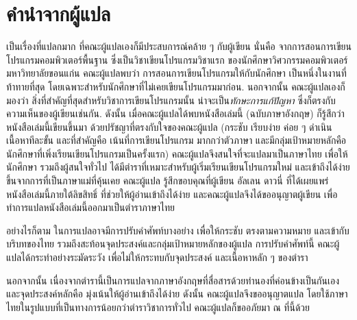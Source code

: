 \pagebreak

\section*{คำนำจากผู้แปล}

เป็นเรื่องที่แปลกมาก ที่คณะผู้แปลเองก็มีประสบการณ์คล้าย ๆ กับผู้เขียน
นั่นคือ จากการสอนการเขียนโปรแกรมคอมพิวเตอร์พื้นฐาน ซึ่งเป็นวิชาเขียนโปรแกรมวิชาแรก
ของนักศึกษาวิศวกรรมคอมพิวเตอร์ มหาวิทยาลัยขอนแก่น
คณะผู้แปลพบว่า
การสอนการเขียนโปรแกรมให้กับนักศึกษา 
เป็นหนึ่งในงานที่ท้าทายที่สุด
โดยเฉพาะสำหรับนักศึกษาที่ไม่เคยเขียนโปรแกรมมาก่อน.
นอกจากนั้น คณะผู้แปลเองก็มองว่า สิ่งที่สำคัญที่สุดสำหรับวิชาการเขียนโปรแกรมนั้น
น่าจะเป็น\textit{ทักษะการแก้ปัญหา}
ซึ่งก็ตรงกับความเห็นของผู้เขียนเช่นกัน.
ดังนั้น เมื่อคณะผู้แปลได้พบหนังสือเล่มนี้ (ฉบับภาษาอังกฤษ) 
ก็รู้สึกว่า หนังสือเล่มนี้เขียนขึ้นมา ด้วยปรัชญาที่ตรงกับใจของคณะผู้แปล (กระชับ เรียบง่าย ค่อย ๆ ดำเนินเนื้อหาทีละขั้น และที่สำคัญคือ เน้นที่การเขียนโปรแกรม มากกว่าตัวภาษา 
และมีกลุ่มเป้าหมายหลักคือ นักศึกษาที่เพิ่งเรียนเขียนโปรแกรมเป็นครั้งแรก)
คณะผู้แปลจึงสนใจที่จะแปลมาเป็นภาษาไทย เพื่อให้นักศึกษา รวมถึงผู้สนใจทั่วไป ได้มีตำราที่เหมาะสำหรับผู้เริ่มเรียนเขียนโปรแกรมใหม่ และเข้าถึงได้ง่ายขึ้นจากการที่เป็นภาษาแม่ที่คุ้นเคย 
คณะผู้แปล 
รู้สึกขอบคุณที่ผู้เขียน อัลเลน ดาวนี่ ที่ได้เผยแพร่หนังสือเล่มนี้ภายใต้ลิขสิทธิ์ ที่ช่วยให้ผู้อ่านเข้าถึงได้ง่าย 
และคณะผู้แปลจึงได้ขออนุญาตผู้เขียน เพื่อทำการแปลหนังสือเล่มนี้ออกมาเป็นตำราภาษาไทย

อย่างไรก็ตาม ในการแปลอาจมีการปรับคำศัพท์บางอย่าง เพื่อให้กระชับ ตรงตามความหมาย และเข้ากับบริบทของไทย รวมถึงสะท้อนจุดประสงค์และกลุ่มเป้าหมายหลักของผู้แปล การปรับคำศัพท์นี้ คณะผู้แปลได้กระทำอย่างระมัดระวัง เพื่อไม่ให้กระทบกับจุดประสงค์ และเนื้อหาหลัก ๆ ของตำรา

นอกจากนั้น 
เนื่องจากตำรานี้เป็นการแปลจากภาษาอังกฤษที่สื่อสารด้วยทำนองที่ค่อนข้างเป็นกันเอง
และจุดประสงค์หลักคือ มุ่งเน้นให้ผู้อ่านเข้าถึงได้ง่าย
ดังนั้น
คณะผู้แปลจึงขออนุญาตแปล โดยใช้ภาษาไทยในรูปแบบที่เป็นทางการน้อยกว่าตำราวิชาการทั่วไป 
คณะผู้แปลก็ขออภัยมา ณ ที่นี้ด้วย 

